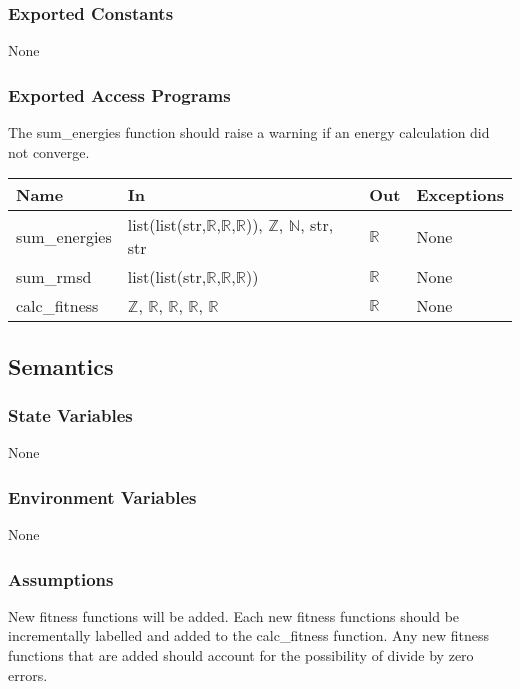 \documentclass[12pt, titlepage]{article}
\begin{document}
\subsubsection{Exported Constants}

None

\subsubsection{Exported Access Programs}

The sum\_energies function should raise a warning if an energy calculation did 
not converge.

\begin{center}
	\begin{tabular}{p{2cm} p{4cm} p{4cm} p{2cm}}
		\hline
		\textbf{Name} & \textbf{In} & \textbf{Out} & \textbf{Exceptions} \\
		\hline
		sum\_energies &  
		list(list(str,$\mathbb{R}$,$\mathbb{R}$,$\mathbb{R}$)), $\mathbb{Z}$, 
		$\mathbb{N}$, str, str & $\mathbb{R}$ 
		& None \\
		sum\_rmsd &  list(list(str,$\mathbb{R}$,$\mathbb{R}$,$\mathbb{R}$)) & 
		$\mathbb{R}$ & None \\
		calc\_fitness & $\mathbb{Z}$, $\mathbb{R}$, $\mathbb{R}$, $\mathbb{R}$, 
		$\mathbb{R}$ & $\mathbb{R}$ & None \\
		\hline
	\end{tabular}
\end{center}

\subsection{Semantics}

\subsubsection{State Variables}

None

\subsubsection{Environment Variables}

None

\subsubsection{Assumptions}

New fitness functions will be added. Each new fitness functions should be 
incrementally labelled and added to the calc\_fitness function. Any new 
fitness functions that are added should account for the possibility of divide 
by zero errors.
\end{document}
